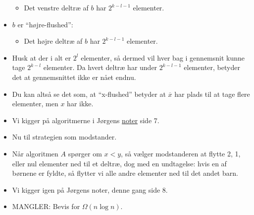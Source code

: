 \begin{frame}[allowframebreaks]
\begin{itemize}
         \begin{itemize}
           \item Det venstre deltræ af $b$ har $2^{k-l-1}$ elementer.
         \end{itemize}
   \item $b$ er ``højre-flushed'':
         \begin{itemize}
           \item Det højre deltræ af $b$ har  $2^{k-l-1}$ elementer.
         \end{itemize}
   \item Husk at der i alt er $2^{l}$ elementer, så dermed vil hver bag i gennemsnit kunne tage $2^{k-l}$ elementer. Da hvert deltræ har under $2^{k-l-1}$ elementer, betyder det at gennemsnittet ikke er nået endnu.
   \item Du kan altså se det som, at ``x-flushed'' betyder at $\overline{x}$ har plads til at tage flere elementer, men $x$ har ikke.
   \item Vi kigger på algoritmerne i Jørgens \href{https://imada.sdu.dk/u/jbj/DM553/Slides21/Lect24.pdf}{noter} side 7.
   \item Nu til strategien som modstander.
   \item Når algoritmen $A$ spørger om $x < y$, så vælger modstanderen at flytte 2, 1, eller nul elementer ned til et deltræ, dog med en undtagelse: hvis en af børnene er fyldte, så flytter vi alle andre elementer ned til det andet barn.
   \item Vi kigger igen på Jørgens noter, denne gang side 8.
   \item MANGLER: Bevis for $\Omega(n \log n)$.
 \end{itemize}
\end{frame}

